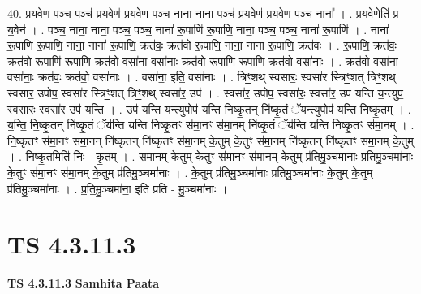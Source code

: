 \documentclass[17pt]{extarticle}
\begin{document}
40. प्र॒य॒वेण॒ पञ्च॒ पञ्च॑ प्रय॒वेण॑ प्रय॒वेण॒ पञ्च॒ नाना॒ नाना॒ पञ्च॑ प्रय॒वेण॑ प्रय॒वेण॒ पञ्च॒ नाना᳚ । . प्र॒य॒वेणेति॑ प्र - य॒वेन॑ । . पञ्च॒ नाना॒ नाना॒ पञ्च॒ पञ्च॒ नाना॑ रू॒पाणि॑ रू॒पाणि॒ नाना॒ पञ्च॒ पञ्च॒ नाना॑ रू॒पाणि॑ । . नाना॑ रू॒पाणि॑ रू॒पाणि॒ नाना॒ नाना॑ रू॒पाणि॒ क्रत॑वः॒ क्रत॑वो रू॒पाणि॒ नाना॒ नाना॑ रू॒पाणि॒ क्रत॑वः । . रू॒पाणि॒ क्रत॑वः॒ क्रत॑वो रू॒पाणि॑ रू॒पाणि॒ क्रत॑वो॒ वसा॑ना॒ वसा॑नाः॒ क्रत॑वो रू॒पाणि॑ रू॒पाणि॒ क्रत॑वो॒ वसा॑नाः । . क्रत॑वो॒ वसा॑ना॒ वसा॑नाः॒ क्रत॑वः॒ क्रत॑वो॒ वसा॑नाः । . वसा॑ना॒ इति॒ वसा॑नाः । . त्रिꣳ॒॒शथ् स्वसा॑रः॒ स्वसा॑र स्त्रिꣳ॒॒शत् त्रिꣳ॒॒शथ् स्वसा॑र॒ उपोप॒ स्वसा॑र स्त्रिꣳ॒॒शत् त्रिꣳ॒॒शथ् स्वसा॑र॒ उप॑ । . स्वसा॑र॒ उपोप॒ स्वसा॑रः॒ स्वसा॑र॒ उप॑ यन्ति य॒न्त्युप॒ स्वसा॑रः॒ स्वसा॑र॒ उप॑ यन्ति । . उप॑ यन्ति य॒न्त्युपोप॑ यन्ति निष्कृ॒तन् नि॑ष्कृ॒तं ॅय॒न्त्युपोप॑ यन्ति निष्कृ॒तम् । . य॒न्ति॒ नि॒ष्कृ॒तन् नि॑ष्कृ॒तं ॅय॑न्ति यन्ति निष्कृ॒तꣳ स॑मा॒नꣳ स॑मा॒नम् नि॑ष्कृ॒तं ॅय॑न्ति यन्ति निष्कृ॒तꣳ स॑मा॒नम् । . नि॒ष्कृ॒तꣳ स॑मा॒नꣳ स॑मा॒नन् नि॑ष्कृ॒तन् नि॑ष्कृ॒तꣳ स॑मा॒नम् के॒तुम् के॒तुꣳ स॑मा॒नम् नि॑ष्कृ॒तन् नि॑ष्कृ॒तꣳ स॑मा॒नम् के॒तुम् । . नि॒ष्कृ॒तमिति॑ निः - कृ॒तम् । . स॒मा॒नम् के॒तुम् के॒तुꣳ स॑मा॒नꣳ स॑मा॒नम् के॒तुम् प्र॑तिमु॒ञ्चमा॑नाः प्रतिमु॒ञ्चमा॑नाः के॒तुꣳ स॑मा॒नꣳ स॑मा॒नम् के॒तुम् प्र॑तिमु॒ञ्चमा॑नाः । . के॒तुम् प्र॑तिमु॒ञ्चमा॑नाः प्रतिमु॒ञ्चमा॑नाः के॒तुम् के॒तुम् प्र॑तिमु॒ञ्चमा॑नाः । . प्र॒ति॒मु॒ञ्चमा॑ना॒ इति॑ प्रति - मु॒ञ्चमा॑नाः । \newline
\pagebreak
{}

\section{ TS 4.3.11.3 }

\textbf{TS 4.3.11.3 } \newline
\textbf{Samhita Paata} \newline
\end{document}
